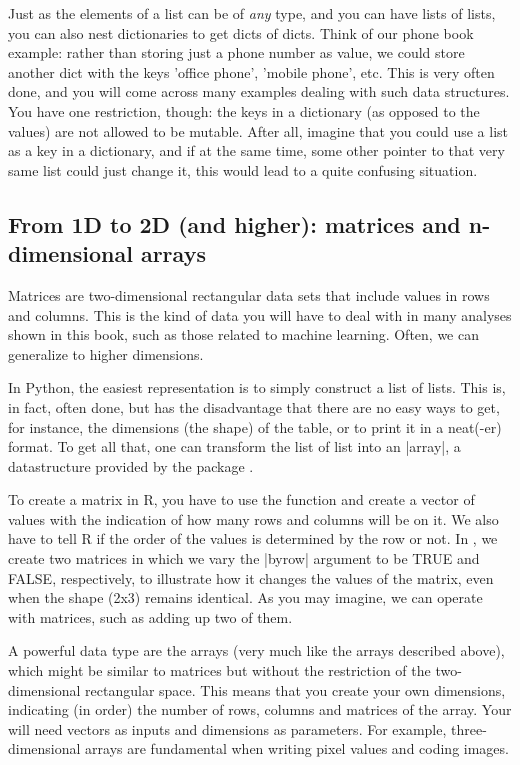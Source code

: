 Just as the elements of a list can be of \emph{any} type, and you can
have lists of lists, you can also nest dictionaries to get dicts of
dicts. Think of our phone book example: rather than storing just a
phone number as value, we could store another dict with the keys
'office phone', 'mobile phone', etc. This is very often done, and you
will come across many examples dealing with such data structures.
You have one restriction, though: the keys in a dictionary (as opposed
to the values) are not allowed to be mutable. After all, imagine that
you could use a list as a key in a dictionary, and if at the same time,
some other pointer to that very same list could just change it, this
would lead to a quite confusing situation.




\subsection{From 1D to 2D (and higher): matrices and n-dimensional arrays}

Matrices are two-dimensional rectangular data sets that include values
in rows and columns. This is the kind of data you will have to deal
with in many analyses shown in this book, such as those related to
machine learning. Often, we can generalize to higher dimensions.


In Python, the easiest representation is to simply construct a list of
lists. This is, in fact, often done, but has the disadvantage that
there are no easy ways to get, for instance, the dimensions (the
shape) of the table, or to print it in a neat(-er) format. To get all
that, one can transform the list of list into an |array|, a
datastructure provided by the package .

To create a matrix in R, you have to use the function  and
create a vector of values with the indication of how many rows and
columns will be on it. We also have to tell R if the order of the
values is determined by the row or not. In , we create
two matrices in which we vary the |byrow| argument to be TRUE and
FALSE, respectively, to illustrate how it changes the values of the
matrix, even when the shape (2x3) remains identical. As you may
imagine, we can operate with matrices, such as adding up two of them.

A powerful data type are the arrays (very much like the 
arrays described above), which might be similar to matrices but
without the restriction of the two-dimensional rectangular space. This
means that you create your own dimensions, indicating (in order) the
number of rows, columns and matrices of the array. Your will need
vectors as inputs and dimensions as parameters. For example,
three-dimensional arrays are fundamental when writing pixel values and
coding images. 


